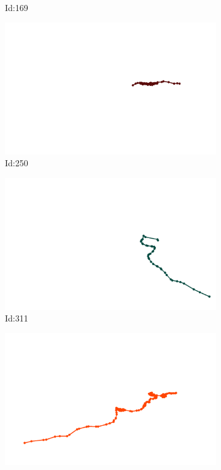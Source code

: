\documentclass[12pt,twoside]{report}
\begin{document}
\begin{figure}
\begin{subfigure}[b]{0.20\textwidth}
\caption{Id:169}
\end{subfigure}
\begin{subfigure}[b]{0.20\textwidth}
\centering
\includegraphics[width=\textwidth]{../trajectories/250.png}
\caption{Id:250}
\end{subfigure}
\begin{subfigure}[b]{0.20\textwidth}
\centering
\includegraphics[width=\textwidth]{../trajectories/311.png}
\caption{Id:311}
\end{subfigure}
\begin{subfigure}[b]{0.20\textwidth}
\centering
\includegraphics[width=\textwidth]{../trajectories/335.png}

\end{subfigure}
\end{figure}
\end{document}

